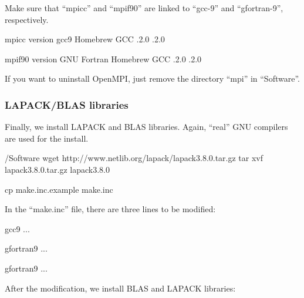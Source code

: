 \documentclass[a4paper,11pt,oneside,english]{sphinxmanual}
\begin{document}
Make sure that “mpicc” and “mpif90” are linked to “gcc-9” and “gfortran-9”, respectively.

\begin{sphinxVerbatim}[commandchars=\\\{\}]
\PYGZdl{} mpicc \PYGZhy{}\PYGZhy{}version
gcc\PYGZhy{}9 Homebrew GCC .2.0 .2.0

\PYGZdl{} mpif90 \PYGZhy{}\PYGZhy{}version
GNU Fortran Homebrew GCC .2.0 .2.0
\end{sphinxVerbatim}

If you want to uninstall OpenMPI, just remove the directory “mpi” in “Software”.


\subsubsection{LAPACK/BLAS libraries}
\label{\detokenize{98_Appendix:id6}}
Finally, we install LAPACK and BLAS libraries.
Again, “real” GNU compilers are used for the install.

\begin{sphinxVerbatim}[commandchars=\\\{\}]
\PYGZdl{}  /Software
\PYGZdl{} wget http://www.netlib.org/lapack/lapack\PYGZhy{}3.8.0.tar.gz
\PYGZdl{} tar \PYGZhy{}xvf lapack\PYGZhy{}3.8.0.tar.gz
\PYGZdl{}  lapack\PYGZhy{}3.8.0

\PYGZdl{} cp make.inc.example make.inc
\end{sphinxVerbatim}

In the “make.inc” file, there are three lines to be modified:

\begin{sphinxVerbatim}[commandchars=\\\{\}]
      gcc\PYGZhy{}9
...

  gfortran\PYGZhy{}9
...

    gfortran\PYGZhy{}9
...
\end{sphinxVerbatim}

After the modification, we install BLAS and LAPACK libraries:
\end{document}
